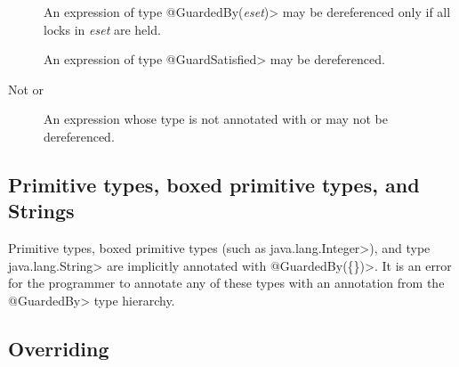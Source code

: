 \begin{description}

\item[]
  An expression of type \<@GuardedBy(\emph{eset})> may be dereferenced only
  if all locks in \emph{eset} are held.

\item[]
  An expression of type \<@GuardSatisfied> may be dereferenced.

\item[Not  or ]
  An expression whose type is not annotated with  or
   may not be dereferenced.

\end{description}

\subsection{Primitive types, boxed primitive types, and Strings\label{lock-type-checking-rules-primitives}}

Primitive types, boxed primitive types (such as \<java.lang.Integer>), and type \<java.lang.String>
are implicitly annotated with \<@GuardedBy(\{\})>.
It is an error for the programmer to annotate any of these types with an annotation from
the \<@GuardedBy> type hierarchy.


\subsection{Overriding\label{lock-type-checking-rules-overriding}}

